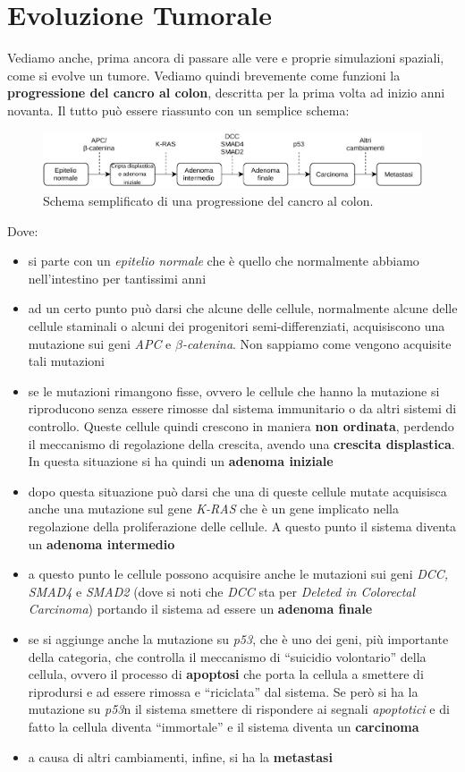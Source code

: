 \documentclass[a4paper,12pt, oneside]{book}
\begin{document}
\section{Evoluzione Tumorale}
Vediamo anche, prima ancora di passare alle vere e proprie simulazioni spaziali,
come si evolve un tumore. Vediamo quindi brevemente come funzioni la
\textbf{progressione del cancro al colon}, descritta per la prima volta ad
inizio anni novanta. Il tutto può essere riassunto con un semplice schema:
\begin{figure}[H]
  \centering
  \includegraphics[scale = 0.8]{img/canc.pdf}
  \caption{Schema semplificato di una progressione del cancro al colon.}
  \label{fig:cp}
\end{figure}
Dove:
\begin{itemize}
  \item si parte con un \textit{epitelio normale} che è quello che normalmente
  abbiamo nell'intestino per tantissimi anni
  \item ad un certo punto può darsi che alcune delle cellule, normalmente alcune
  delle cellule staminali o alcuni dei progenitori semi-differenziati,
  acquisiscono una mutazione sui geni \textit{APC} e
  $\beta$\textit{-catenina}. Non sappiamo come vengono acquisite tali mutazioni 
  \item se le mutazioni rimangono fisse, ovvero le cellule che hanno la
  mutazione si riproducono senza essere rimosse dal sistema immunitario o da
  altri sistemi di controllo. Queste cellule quindi crescono in maniera
  \textbf{non ordinata}, perdendo il meccanismo di regolazione della crescita,
  avendo una \textbf{crescita displastica}. In questa situazione si ha quindi un
  \textbf{adenoma iniziale} 
  \item dopo questa situazione può darsi che una di queste cellule mutate
  acquisisca anche una mutazione sul gene \textit{K-RAS} che è un gene implicato
  nella regolazione della proliferazione delle cellule. A questo punto il
  sistema diventa un \textbf{adenoma intermedio}
  \item a questo punto le cellule possono acquisire anche le mutazioni sui geni
  \textit{DCC, SMAD4} e \textit{SMAD2} (dove si noti che \textit{DCC} sta per
  \textit{Deleted in Colorectal Carcinoma}) portando il sistema ad essere un
  \textbf{adenoma finale}
  \item se si aggiunge anche la mutazione su \textit{p53}, che è uno dei geni,
  più importante della categoria, che controlla il meccanismo di ``suicidio
  volontario'' della cellula, ovvero il processo di \textbf{apoptosi} che porta
  la cellula a smettere di riprodursi e ad essere rimossa e ``riciclata'' dal
  sistema. Se però si ha la mutazione su \textit{p53}n il sistema smettere di
  rispondere ai segnali \textit{apoptotici} e di fatto la cellula diventa
  ``immortale'' e il sistema diventa un \textbf{carcinoma}
  \item a causa di altri cambiamenti, infine, si ha la \textbf{metastasi}
\end{itemize}
\end{document}
